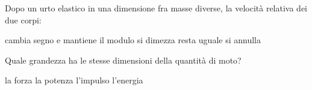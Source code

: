 \documentclass[a4paper,10pt]{exam}
\begin{document}
\begin{questions}
\question Dopo un urto elastico in una dimensione fra masse diverse, la velocità relativa dei due corpi:
\vspace{0.2em}
\begin{choices}
\choice cambia segno e mantiene il modulo
\choice si dimezza
\choice resta uguale
\choice si annulla
\end{choices}

\question Quale grandezza ha le stesse dimensioni della quantità di moto?
\vspace{0.2em}
\begin{choices}
\choice la forza
\choice la potenza
\choice l'impulso
\choice l'energia
\end{choices}

\end{questions}

\clearpage\ifodd\value{page}\thispagestyle{empty}\null\clearpage\fi
\thispagestyle{empty}\null
\end{document}
